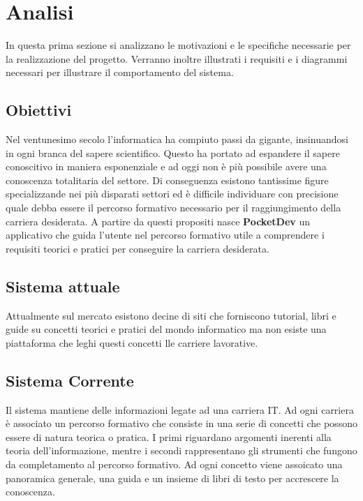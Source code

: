 \section{Analisi}
In questa prima sezione si analizzano le motivazioni e le specifiche necessarie per la realizzazione del progetto. Verranno inoltre illustrati i requisiti e i diagrammi necessari per illustrare il comportamento del sistema.
\subsection{Obiettivi}
Nel ventunesimo secolo l'informatica ha compiuto passi da gigante, insinuandosi in ogni branca del sapere scientifico. Questo ha portato ad espandere il sapere conoscitivo in maniera esponenziale e ad oggi non è più possibile avere una conoscenza totalitaria del settore. Di conseguenza esistono tantissime figure specializzande nei più disparati settori ed è difficile individuare con precisione quale debba essere il percorso formativo necessario per il raggiungimento della carriera desiderata. A partire da questi propositi nasce \textbf{PocketDev} un applicativo che guida l'utente nel percorso formativo utile a comprendere i requisiti teorici e pratici per conseguire la carriera desiderata.
\subsection{Sistema attuale}
Attualmente sul mercato esistono decine di siti che forniscono tutorial, libri e guide su concetti teorici e pratici del mondo informatico ma non esiste una piattaforma che leghi questi concetti lle carriere lavorative.
\subsection{Sistema Corrente}
Il sistema mantiene delle informazioni legate ad una carriera IT. Ad ogni carriera è associato un percorso formativo che consiste in una serie di concetti che possono essere di natura teorica o pratica. I primi riguardano argomenti inerenti alla teoria dell'informazione, mentre i secondi rappresentano gli strumenti che fungono da completamento al percorso formativo. Ad ogni concetto viene assoicato una panoramica generale, una guida e un insieme di libri di testo per accrescere la conoscenza. 
